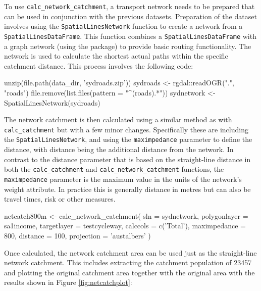 To use \texttt{calc\_network\_catchment}, a transport network needs to
be prepared that can be used in conjunction with the previous datasets.
Preparation of the dataset involves using the
\texttt{SpatialLinesNetwork} function to create a network from a
\texttt{SpatialLinesDataFrame}. This function combines a
\texttt{SpatialLinesDataFrame} with a graph network (using the
 package) to provide basic routing functionality. The
network is used to calculate the shortest actual paths within the
specific catchment distance. This process involves the following code:

\begin{Schunk}
\begin{Sinput}
unzip(file.path(data_dir, 'sydroads.zip'))
sydroads <- rgdal::readOGR(".", "roads")
file.remove(list.files(pattern = "^(roads).*"))
sydnetwork <- SpatialLinesNetwork(sydroads)
\end{Sinput}
\end{Schunk}

The network catchment is then calculated using a similar method as with
\texttt{calc\_catchment} but with a few minor changes. Specifically
these are including the \texttt{SpatialLinesNetwork}, and using the
\texttt{maximpedance} parameter to define the distance, with distance
being the additional distance from the network. In contrast to the
distance parameter that is based on the straight-line distance in both
the \texttt{calc\_catchment} and \texttt{calc\_network\_catchment}
functions, the \texttt{maximpedance} parameter is the maximum value in
the units of the network's weight attribute. In practice this is
generally distance in metres but can also be travel times, risk or other
measures.

\begin{Schunk}
\begin{Sinput}
netcatch800m <- calc_network_catchment(
  sln = sydnetwork,
  polygonlayer = sa1income,
  targetlayer = testcycleway,
  calccols = c('Total'),
  maximpedance = 800,
  distance = 100,
  projection = 'austalbers'
)
\end{Sinput}
\end{Schunk}

Once calculated, the network catchment area can be used just as the
straight-line network catchment. This includes extracting the catchment
population of 23457 and plotting the original catchment area together
with the original area with the results shown in Figure
\ref{fig:netcatchplot}:


